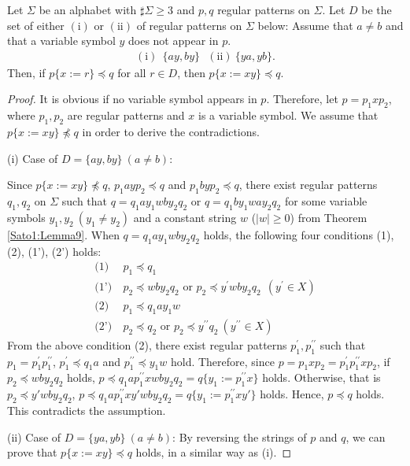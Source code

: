 \begin{lem}\label{変数2つ}
Let $\Sigma$ be an alphabet with $\sharp\Sigma \ge 3$ and $p,q$ regular patterns on $\Sigma$.
Let $D$ be the set of either $(\mathrm{i})$ or $(\mathrm{ii})$ of regular patterns on $\Sigma$ below: Assume that $a \not= b$ and that a variable symbol $y$ does not appear in $p$.
\begin{align*}
(\mathrm{i})~~\{ ay, by \}~~~(\mathrm{ii})~\{ ya, yb \}.
\end{align*}
Then, if $p \{ x := r \} \preceq q$ for all $r \in D$, then $p \{ x := xy \} \preceq q$.
\end{lem}
\begin{proof}
It is obvious if no variable symbol appears in $p$. 
Therefore, let $p=p_{1}xp_{2}$, where $p_{1}, p_{2}$ are regular patterns and $x$ is a variable symbol.
We assume that $p \{ x := xy \} \not \preceq q$ in order to derive the contradictions.

\noindent
(i) 
Case of $D=\{ ay, by \} \ (a \ne b)$:

\noindent
Since $p \{ x := xy \} \not \preceq q$, $p_{1}ayp_{2}\preceq q$ and $p_{1}byp_{2}\preceq q$, 
there exist regular patterns $q_{1},q_{2}$ on $\Sigma$ such that $q=q_{1}ay_{1}wby_{2}q_{2}$ or $q=q_{1}by_{1}way_{2}q_{2}$ for some variable symbols $y_{1},y_{2}~(y_{1} \not= y_{2})$ and a constant string $w$ ($|w|\geq 0$) from Theorem \ref{Sato1:Lemma9}.
When $q=q_{1}ay_{1}wby_{2}q_{2}$ holds, the following four conditions (1), (2), (1'), (2') holds:
\begin{align*}
\textrm{(1)} & ~p_{1} \preceq q_{1}\\
\textrm{(1')} & ~p_{2} \preceq wby_{2}q_{2} \mbox{ or } p_{2} \preceq y^{\prime}wby_{2}q_{2} ~~(y^{\prime} \in X)\\
\textrm{(2)} & ~p_{1} \preceq q_{1}ay_{1}w\\
\textrm{(2')} & ~p_{2} \preceq q_{2} \mbox{ or } p_{2} \preceq y^{\prime\prime}q_{2} ~(y^{\prime\prime} \in X)
\end{align*}
From the above condition (2), there exist regular patterns $p_{1}^{\prime},p_{1}^{\prime\prime}$ such that $p_{1}=p_{1}^{\prime}p_{1}^{\prime\prime}$, $p_{1}^{\prime} \preceq q_{1}a$ and $p_{1}^{\prime\prime} \preceq y_{1}w$ hold.
Therefore, since $p=p_{1}xp_{2}=p_{1}^{\prime}p_{1}^{\prime\prime}xp_{2}$,
if $p_{2} \preceq wby_{2}q_{2}$ holds, 
$p\preceq q_{1}ap_{1}^{\prime\prime}xwby_{2}q_{2}=q \{ y_{1} := p_{1}^{\prime\prime}x \}$ holds.
Otherwise, that is $p_2\preceq y'wby_{2}q_{2}$, $p\preceq q_{1}ap_{1}^{\prime\prime}xy'wby_{2}q_{2}=q \{ y_{1} := p_{1}^{\prime\prime}xy' \}$ holds.
Hence, $p \preceq q$ holds.
This contradicts the assumption.

\noindent
(ii) 
Case of $D=\{ ya, yb \} \ (a \ne b)$:
By reversing the strings of $p$ and $q$, we can prove that $p \{ x := xy \} \preceq q$ holds, in a similar way as (i).
\end{proof}

